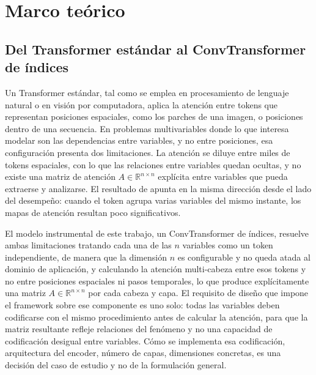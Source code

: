 
\chapter{Marco teórico}
\label{cap:marco}

\section{Del Transformer estándar al ConvTransformer de índices}

Un Transformer estándar, tal como se emplea en procesamiento de lenguaje natural o en visión por computadora, aplica la atención entre tokens que representan posiciones espaciales, como los parches de una imagen, o posiciones dentro de una secuencia. En problemas multivariables donde lo que interesa modelar son las dependencias entre variables, y no entre posiciones, esa configuración presenta dos limitaciones. La atención se diluye entre miles de tokens espaciales, con lo que las relaciones entre variables quedan ocultas, y no existe una matriz de atención $A \in \mathbb{R}^{n\times n}$ explícita entre variables que pueda extraerse y analizarse. El resultado de \textcite{liu2024itransformer} apunta en la misma dirección desde el lado del desempeño: cuando el token agrupa varias variables del mismo instante, los mapas de atención resultan poco significativos.

El modelo instrumental de este trabajo, un ConvTransformer de índices, resuelve ambas limitaciones tratando cada una de las $n$ variables como un token independiente, de manera que la dimensión $n$ es configurable y no queda atada al dominio de aplicación, y calculando la atención multi-cabeza entre esos tokens y no entre posiciones espaciales ni pasos temporales, lo que produce explícitamente una matriz $A \in \mathbb{R}^{n\times n}$ por cada cabeza y capa. El requisito de diseño que impone el framework sobre ese componente es uno solo: todas las variables deben codificarse con el mismo procedimiento antes de calcular la atención, para que la matriz resultante refleje relaciones del fenómeno y no una capacidad de codificación desigual entre variables. Cómo se implementa esa codificación, arquitectura del encoder, número de capas, dimensiones concretas, es una decisión del caso de estudio y no de la formulación general.

